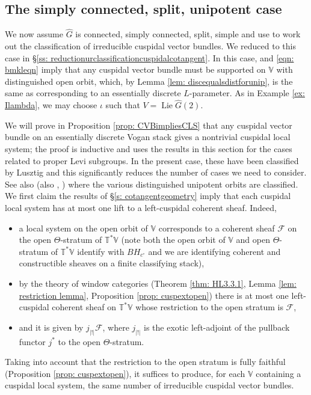 \documentclass{amsart}
\theoremstyle{definition}
\theoremstyle{remark}
\numberwithin{equation}{section}
\DeclareMathOperator{\Lie}{Lie}
\newcommand{\mc}{\mathcal}
\newcommand{\wh}{\widehat}
\newcommand{\V}{\mathbb{V}}
\newcommand{\T}{\mathbb{T}}
\newcommand{\ush}{\lvert ! \rvert}
\begin{document}
\subsection{The simply connected, split, unipotent case}{\label{ss: classificationunipotentcase}}

We now assume $\wh{G}$ is connected, simply connected, split, simple and use \cite{BMKL} to work out the classification of irreducible cuspidal vector bundles. We reduced to this case in \S \ref{ss: reductionurclassificationcuspidalcotangent}. In this case, \cite[Theorem 1.2]{BMKL} and \eqref{eqn: bmkleqn} imply that any cuspidal vector bundle must be supported on $\V$ with distinguished open orbit, which, by Lemma \ref{lem: discequalsdistforunip}, is the same as corresponding to an essentially discrete $L$-parameter. As in Example \ref{ex: Ilambda}, we may choose $\iota$ such that $V = \Lie \wh{G}(2)$. 

We will prove in Proposition \ref{prop: CVBimpliesCLS} that any cuspidal vector bundle on an essentially discrete Vogan stack gives a nontrivial cuspidal local system; the proof is inductive and uses the results in this section for the cases related to proper Levi subgroups. In the present case, these have been classified by Lusztig \cite{LusztigIntersection} and this significantly reduces the number of cases we need to consider. See also \cite{BalaCarterI} (also \cite{BalaCarterII}, \cite[\S8.4]{CollingWoodMcGovern}) where the various distinguished unipotent orbits are classified. We first claim the results of \S\ref{s: cotangentgeometry} imply that each cuspidal local system has at most one lift to a left-cuspidal coherent sheaf. Indeed, 
\begin{itemize}
    \item a local system on the open orbit of $\V$ corresponds to a coherent sheaf $\mc{F}$ on the open $\Theta$-stratum of $\T^{\ast}\V$  (note both the open orbit of $\V$ and open $\Theta$-stratum of $\T^{\ast}\V$ identify with $BH_{c^{\circ}}$ and we are identifying coherent and constructible sheaves on a finite classifying stack),
    \item by the theory of window categories (Theorem \ref{thm: HL3.3.1}, Lemma \ref{lem: restriction lemma}, Proposition \ref{prop: cuspextopen}) there is at most one left-cuspidal coherent sheaf on $\T^{\ast} \V$ whose restriction to the open stratum is $\mc{F}$, 
    \item and it is given by $j_{\ush}\mc{F}$, where $j_{\ush}$ is the exotic left-adjoint of the pullback functor $j^{\ast}$ to the open $\Theta$-stratum.
\end{itemize}
Taking into account that the restriction to the open stratum is fully faithful (Proposition \ref{prop: cuspextopen}), it suffices to produce, for each $\V$ containing a cuspidal local system, the same number of irreducible cuspidal vector bundles.
\end{document}
